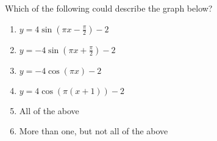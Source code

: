 \bigskip

\item Which of the following could describe the graph below?


\begin{minipage}{0.4\columnwidth}
    \begin{enumerate}
        \item $y = 4 \sin\left( \pi x - \frac{\pi}{2}\right) - 2$
        \item $y = -4 \sin\left( \pi x + \frac{\pi}{2}\right) - 2$
        \item $y = -4 \cos( \pi x ) - 2$
        \item $y = 4 \cos( \pi ( x+1) ) - 2$
        \item All of the above
        \item More than one, but not all of the above
    \end{enumerate}
\end{minipage}
\begin{minipage}{0.6\columnwidth}
\end{minipage}

